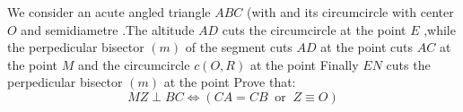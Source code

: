 We consider an acute angled triangle $ABC$ (with  and its circumcircle with center $O$ and semidiametre .The altitude $AD$ cuts the circumcircle at the point $E$ ,while the perpedicular bisector $(m)$ of the segment cuts $AD$ at the point  cuts $AC$ at the point $M$ and the circumcircle $c(O,R)$ at the point Finally $EN$ cuts the perpedicular bisector $(m)$ at the point Prove that:
\[ MZ \perp BC \iff \left(CA=CB \;\; \text{or} \;\; Z\equiv O \right) \]